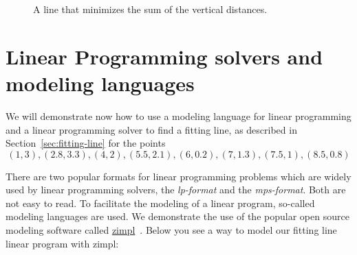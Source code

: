 \begin{figure}
  \centering


  \caption{A line that minimizes the sum of the vertical distances.}
  \label{fig:4}
\end{figure}


\section{Linear Programming solvers and modeling languages}
\label{sec:line-progr-solv}

We will demonstrate now how to use a modeling language for linear
programming and a linear programming solver to find a fitting line, as
described in Section~\ref{sec:fitting-line} for the points 
\begin{displaymath}
   (1,3), (2.8,3.3),(4,2),(5.5,2.1),(6,0.2), (7,1.3), (7.5,1), (8.5,0.8) 
\end{displaymath}

There are two popular formats for linear programming problems which
are widely used by linear programming solvers, the \emph{lp-format}
and the \emph{mps-format}. Both are not easy to read. To facilitate
the modeling of a linear program, so-called modeling languages are
used. We demonstrate the use of the popular open source modeling
software called
\href{http://www.zib.de/koch/zimpl}{zimpl}~\cite{Koch2004}. Below you
see a way to model our fitting line linear program with zimpl:

